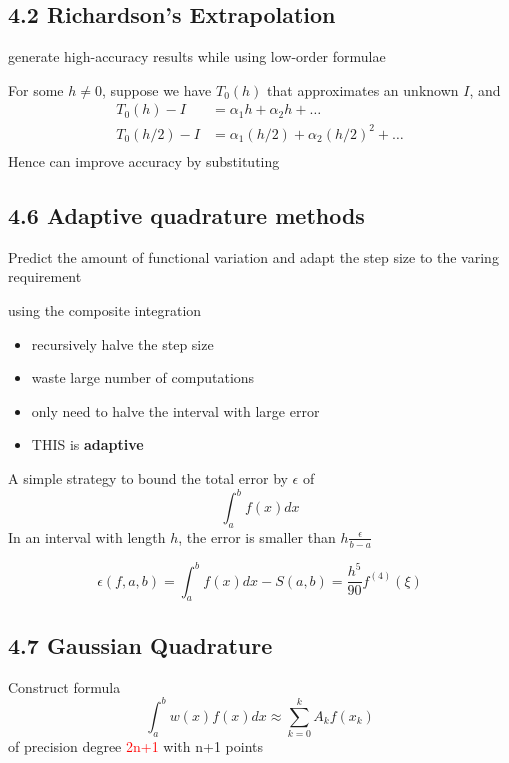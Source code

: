 \documentclass[11pt]{article}
\begin{document}
\subsection{4.2 Richardson's Extrapolation}
\label{sec:orge95a7d9}
generate high-accuracy results while using low-order formulae

For some \(h\neq 0\), suppose we have \(T_0(h)\) that approximates an unknown
\(I\), and
\begin{align*}
T_0(h)-I&=\alpha_1 h+\alpha_2h+\dots\\
T_0(h/2)-I&=\alpha_1(h/2)+\alpha_2(h/2)^2+\dots\\
\end{align*}
Hence can improve accuracy by substituting

\subsection{4.6 Adaptive quadrature methods}
\label{sec:org2663f3d}
Predict the amount of functional variation and adapt the step size to the
varing requirement

using the composite integration
\begin{itemize}
\item recursively halve the step size
\item waste large number of computations
\item only need to halve the interval with large error
\item THIS is \textbf{adaptive}
\end{itemize}


A simple strategy to bound the total error by \(\epsilon\) of
\begin{equation*}
\int_a^bf(x)dx
\end{equation*}
In an interval with length \(h\), the error is smaller than
\(h\frac{\epsilon}{b-a}\)


\begin{equation*}
\epsilon(f,a,b)=\int_a^bf(x)dx-S(a,b)=\frac{h^5}{90}f^{(4)}(\xi)
\end{equation*}

\subsection{4.7 Gaussian Quadrature}
\label{sec:org0ff3e4b}
Construct formula 
\begin{equation*}
\int_a^bw(x)f(x)dx\approx \displaystyle\sum_{k=0}^kA_kf(x_k)
\end{equation*}
of precision degree \textcolor{red}{2n+1} with n+1 points
\end{document}
